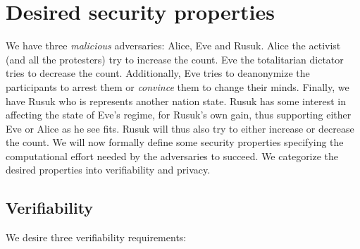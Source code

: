 \section{Desired security properties}%
\label{Properties}


We have three \emph{malicious} adversaries: Alice, Eve and Rusuk.
Alice the activist (and all the protesters) try to increase the count.
Eve the totalitarian dictator tries to decrease the count.
Additionally, Eve tries to deanonymize the participants to arrest them or 
\emph{convince} them to change their minds.
Finally, we have Rusuk who is represents another nation state.
Rusuk has some interest in affecting the state of Eve's regime, for Rusuk's own 
gain, thus supporting either Eve or Alice as he see fits.
Rusuk will thus also try to either increase or decrease the count.
We will now formally define some security properties specifying the 
computational effort needed by the adversaries to succeed.
We categorize the desired properties into verifiability and privacy.

\subsection{Verifiability}%
\label{Verifiability}

We desire three verifiability requirements:

